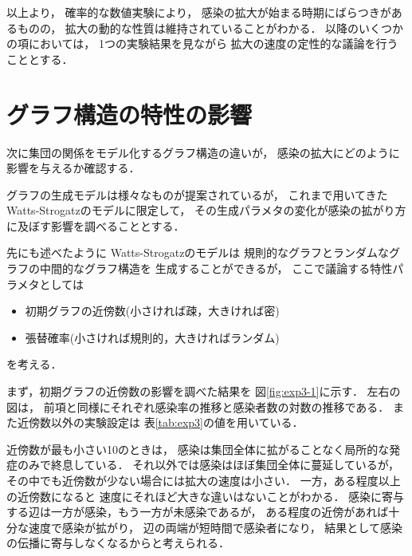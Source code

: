 \documentclass[10pt,oneside]{scrartcl}
\begin{document}
\begin{figure*}%
  \centering
\end{figure*}

以上より，
確率的な数値実験により，
感染の拡大が始まる時期にばらつきがあるものの，
拡大の動的な性質は維持されていることがわかる．
以降のいくつかの項においては，
1つの実験結果を見ながら
拡大の速度の定性的な議論を行うこととする．

\section{グラフ構造の特性の影響}
\label{sec:org9ba92a1}

次に集団の関係をモデル化するグラフ構造の違いが，
感染の拡大にどのように影響を与えるか確認する．

グラフの生成モデルは様々なものが提案されているが，
これまで用いてきた
Watts-Strogatzのモデルに限定して，
その生成パラメタの変化が感染の拡がり方に及ぼす影響を調べることとする．

先にも述べたように
Watts-Strogatzのモデルは
規則的なグラフとランダムなグラフの中間的なグラフ構造を
生成することができるが，
ここで議論する特性パラメタとしては
\begin{itemize}
\item 初期グラフの近傍数(小さければ疎，大きければ密)
\item 張替確率(小さければ規則的，大きければランダム)
\end{itemize}
を考える．

まず，初期グラフの近傍数の影響を調べた結果を
図\ref{fig:exp3-1}に示す．
左右の図は，
前項と同様にそれぞれ感染率の推移と感染者数の対数の推移である．
また近傍数以外の実験設定は
表\ref{tab:exp3}の値を用いている．

近傍数が最も小さい10のときは，
感染は集団全体に拡がることなく局所的な発症のみで終息している．
それ以外では感染はほぼ集団全体に蔓延しているが，
その中でも近傍数が少ない場合には拡大の速度は小さい．
一方，ある程度以上の近傍数になると
速度にそれほど大きな違いはないことがわかる．
感染に寄与する辺は一方が感染，もう一方が未感染であるが，
ある程度の近傍があれば十分な速度で感染が拡がり，
辺の両端が短時間で感染者になり，
結果として感染の伝播に寄与しなくなるからと考えられる．

\begin{figure*}%
  \centering
\end{figure*}
\end{document}
